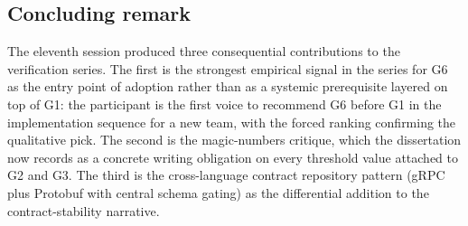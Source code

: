 \subsection*{Concluding remark}

The eleventh session produced three consequential contributions to the verification series. The first is the strongest empirical signal in the series for G6 as the entry point of adoption rather than as a systemic prerequisite layered on top of G1: the participant is the first voice to recommend G6 before G1 in the implementation sequence for a new team, with the forced ranking confirming the qualitative pick. The second is the magic-numbers critique, which the dissertation now records as a concrete writing obligation on every threshold value attached to G2 and G3. The third is the cross-language contract repository pattern (gRPC plus Protobuf with central schema gating) as the differential addition to the contract-stability narrative.
